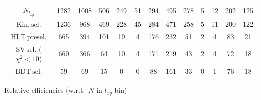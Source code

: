 \documentclass[10pt,a4paper]{article}
\begin{document}
\begin{landscape}
{\begin{tabular}{c|cccc|cccc|cccc}
\midrule
$N_{l_{xy}}$ & 1282 & 1008 & 506 & 249 & 51 & 294 & 495 & 278 & 5 & 12 & 202 & 125\\
$\mathrm{Kin.\ sel.}$ & 1236 & 968 & 469 & 228 & 45 & 284 & 471 & 258 & 5 & 11 & 200 & 122\\
$\mathrm{HLT\ presel.}$ & 665 & 394 & 101 & 19 & 4 & 176 & 232 & 51 & 2 & 4 & 83 & 21\\
$\mathrm{SV\ sel.}$ ($\chi^2{<}10$) & 660 & 366 & 64 & 10 & 4 & 171 & 219 & 43 & 2 & 4 & 72 & 18\\
$\mathrm{BDT\ sel.}$ & 59 & 69 & 15 & 0 & 0 & 88 & 161 & 33 & 0 & 1 & 76 & 18\\
\bottomrule
\end{tabular}}

\vspace{18pt}

Relative efficiencies (w.r.t.\ $N$ in $l_{xy}$ bin)


\end{landscape}
\end{document}
